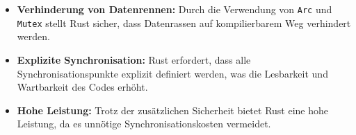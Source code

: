 \begin{itemize}
    \item \textbf{Verhinderung von Datenrennen:} Durch die Verwendung von \texttt{Arc} und \texttt{Mutex} stellt Rust sicher, dass Datenrassen auf kompilierbarem Weg verhindert werden.
    \item \textbf{Explizite Synchronisation:} Rust erfordert, dass alle Synchronisationspunkte explizit definiert werden, was die Lesbarkeit und Wartbarkeit des Codes erhöht.
    \item \textbf{Hohe Leistung:} Trotz der zusätzlichen Sicherheit bietet Rust eine hohe Leistung, da es unnötige Synchronisationskosten vermeidet.
\end{itemize}
\noindent

